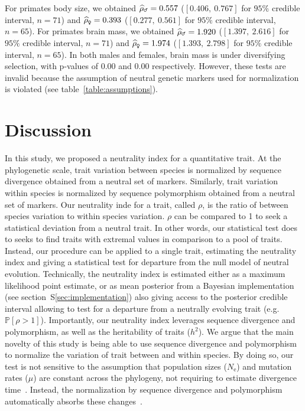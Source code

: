 \documentclass{article}
\newcommand{\Ne}{N_{\text{e}}}
\newcommand{\proba}{\mathbb{P}}
\newcommand{\NbrTaxa}{n}
\newcommand{\Heredity}{h^2}
\newcommand{\MutationRate}{\mu}
\newcommand{\NI}{\rho}
\newcommand{\EstNI}{\widehat{\rho}}
\begin{document}
For primates body size, we obtained $\EstNI_{\text{\Male}} = 0.557$ ($[0.406,~0.767]$ for $95\%$ credible interval, $\NbrTaxa=71$) and $\EstNI_{\text{\Female}} = 0.393$ ($[0.277,~0.561]$ for $95\%$ credible interval, $\NbrTaxa=65$).
For primates brain mass, we obtained $\EstNI_{\text{\Male}} = 1.920$ ($[1.397,~2.616]$ for $95\%$ credible interval, $\NbrTaxa=71$) and $\EstNI_{\text{\Female}} = 1.974$ ($[1.393,~2.798]$ for $95\%$ credible interval, $\NbrTaxa=65$).
In both males and females, brain mass is under diversifying selection, with p-values of $0.00$ and $0.00$ respectively.
However, these tests are invalid because the assumption of neutral genetic markers used for normalization is violated (see table~\ref{table:assumptions}).

\section*{Discussion}\label{sec:discussion}

In this study, we proposed a neutrality index for a quantitative trait.
At the phylogenetic scale, trait variation between species is normalized by sequence divergence obtained from a neutral set of markers.
Similarly, trait variation within species is normalized by sequence polymorphism obtained from a neutral set of markers.
Our neutrality inde for a trait, called $\NI$, is the ratio of between species variation to within species variation.
$\NI$ can be compared to 1 to seek a statistical deviation from a neutral trait.
In other words, our statistical test does to seeks to find traits with extremal values in comparison to a pool of traits.
Instead, our procedure can be applied to a single trait, estimating the neutrality index and giving a statistical test for departure from the null model of neutral evolution.
Technically, the neutrality index is estimated either as a maximum likelihood point estimate, or as mean posterior from a Bayesian implementation (see section~S\ref{sec:implementation}) also giving access to the posterior credible interval allowing to test for a departure from a neutrally evolving trait (e.g. $ \proba [ \NI > 1 ]$).
Importantly, our neutrality index leverages sequence divergence and polymorphism, as well as the heritability of traits ($\Heredity$).
We argue that the main novelty of this study is being able to use sequence divergence and polymorphism to normalize the variation of trait between and within species.
By doing so, our test is not sensitive to the assumption that population sizes ($\Ne$) and mutation rates ($\MutationRate$) are constant across the phylogeny, not requiring to estimate divergence time~\cite{litsios_effects_2012}.
Instead, the normalization by sequence divergence and polymorphism automatically absorbs these changes~\cite{seo_estimating_2004}.
\end{document}
